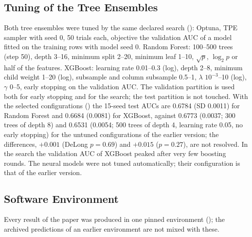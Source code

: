 \documentclass[11pt,a4paper]{article}
\begin{document}
\subsection{Tuning of the Tree Ensembles}
\label{app:hyperparams}

Both tree ensembles were tuned by the same declared search (): Optuna, TPE sampler with seed 0, 50 trials each, objective the validation AUC of a model fitted on the training rows with model seed 0. Random Forest: 100--500 trees (step 50), depth 3--16, minimum split 2--20, minimum leaf 1--10, $\sqrt{p}$, $\log_2 p$ or half of the features. XGBoost: learning rate 0.01--0.3 (log), depth 2--8, minimum child weight 1--20 (log), subsample and column subsample 0.5--1, $\lambda$ $10^{-3}$--10 (log), $\gamma$ 0--5, early stopping on the validation AUC. The validation partition is used both for early stopping and for the search; the test partition is not touched. With the selected configurations () the 15-seed test AUCs are 0.6784 (SD 0.0011) for Random Forest and 0.6684 (0.0081) for XGBoost, against 0.6773 (0.0037; 300 trees of depth 8) and 0.6531 (0.0054; 500 trees of depth 4, learning rate 0.05, no early stopping) for the untuned configurations of the earlier version; the differences, $+0.001$ (DeLong $p=0.69$) and $+0.015$ ($p=0.27$), are not resolved. In the search the validation AUC of XGBoost peaked after very few boosting rounds. The neural models were not tuned automatically; their configuration is that of the earlier version.

\subsection{Software Environment}

Every result of the paper was produced in one pinned environment (); the archived predictions of an earlier environment are not mixed with these.
\end{document}
